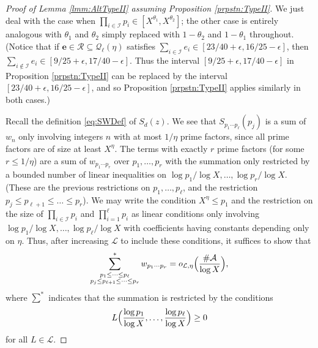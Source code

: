 \documentclass[10pt]{amsart}
\theoremstyle{plain}
\numberwithin{sblmm}{thrm}
\numberwithin{equation}{section}
\begin{document}
\begin{proof}[Proof of Lemma \ref{lmm:AltTypeII} assuming Proposition \ref{prpstn:TypeII}]
We just deal with the case when $\prod_{i\in\mathcal{I}}p_i\in[X^{\theta_1},X^{\theta_2}]$; the other case is entirely analogous with $\theta_1$ and $\theta_2$ simply replaced with $1-\theta_2$ and $1-\theta_1$ throughout. (Notice that if $\mathbf{e}\in\mathcal{R}\subseteq\mathcal{Q}_\ell(\eta)$ satisfies $\sum_{i\in\mathcal{I}}e_i\in[23/40+\epsilon,16/25-\epsilon]$, then $\sum_{i\notin\mathcal{I}}e_i\in[9/25+\epsilon,17/40-\epsilon]$. Thus the interval $[9/25+\epsilon,17/40-\epsilon]$ in Proposition \ref{prpstn:TypeII} can be replaced by the interval $[23/40+\epsilon,16/25-\epsilon]$, and so Proposition \ref{prpstn:TypeII} applies similarly in both cases.) 

Recall the definition \eqref{eq:SWDef} of $S_{d}(z)$. We see that $S_{p_1\cdots p_\ell}(p_j)$ is a sum of $w_n$ only involving integers $n$ with at most $1/\eta$ prime factors, since all prime factors are of size at least $ X^{\eta}$. The terms with exactly $r$ prime factors (for some $r\le 1/\eta$) are a sum of $w_{p_1\cdots p_r}$ over $p_1,\dots,p_r$ with the summation only restricted by a bounded number of linear inequalities on $\log{p_1}/\log{X},\dots,\log{p_r}/\log{X}$. (These are the previous restrictions on $p_1,\dots,p_\ell$, and the restriction $p_j\le p_{\ell+1}\le \dots \le p_r$). We may write the condition $X^{\eta}\le p_1$ and the restriction on the size of $\prod_{i\in\mathcal{I}}p_i$ and $\prod_{i=1}^\ell p_i$ as linear conditions only involving $\log{p_1}/\log{X},\dots,\log{p_\ell}/\log{X}$ with coefficients having constants depending only on $\eta$. Thus, after increasing $\mathcal{L}$ to include these conditions, it suffices to show that
\begin{equation}
\sum_{\substack{p_1\le \dots\le p_\ell \\ p_j\le p_{\ell+1}\le \dots \le p_r}}^* w_{p_1\cdots p_r}=o_{\mathcal{L},\eta}\Bigl(\frac{\#\mathcal{A}}{\log{X}}\Bigr),\label{eq:FactorSum}
\end{equation}
where $\sum^*$ indicates that the summation is restricted by the conditions
\begin{equation}
L\Bigl(\frac{\log{p_1}}{\log{X}},\dots ,\frac{\log{p_\ell}}{\log{X}}\Bigr)\ge 0\label{eq:LConstraints}
\end{equation}
for all $L\in\mathcal{L}$.


\end{proof}
\end{document}
